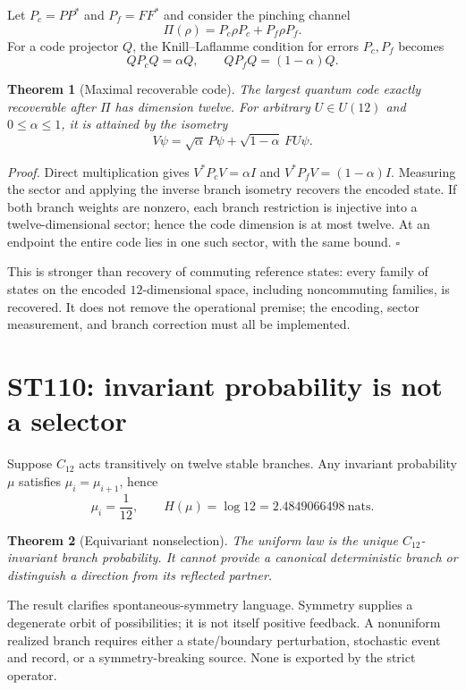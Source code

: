 \documentclass[11pt,a4paper]{article}
\newtheorem{theorem}{Theorem}[section]
\begin{document}
Let $P_c=PP^*$ and $P_f=FF^*$ and consider the pinching channel
\[
\Pi(\rho)=P_c\rho P_c+P_f\rho P_f.
\]
For a code projector $Q$, the Knill--Laflamme condition for errors $P_c,P_f$ becomes
\[
QP_cQ=\alpha Q,\qquad QP_fQ=(1-\alpha)Q.
\]

\begin{theorem}[Maximal recoverable code]
The largest quantum code exactly recoverable after $\Pi$ has dimension twelve. For arbitrary $U\in U(12)$ and $0\le\alpha\le1$, it is attained by the isometry
\[
V\psi=\sqrt\alpha\,P\psi+\sqrt{1-\alpha}\,FU\psi.
\]
\end{theorem}

\textit{Proof.} Direct multiplication gives $V^*P_cV=\alpha I$ and $V^*P_fV=(1-\alpha)I$. Measuring the sector and applying the inverse branch isometry recovers the encoded state. If both branch weights are nonzero, each branch restriction is injective into a twelve-dimensional sector; hence the code dimension is at most twelve. At an endpoint the entire code lies in one such sector, with the same bound. \hfill$\square$

This is stronger than recovery of commuting reference states: every family of states on the encoded $12$-dimensional space, including noncommuting families, is recovered. It does not remove the operational premise; the encoding, sector measurement, and branch correction must all be implemented.

\section{ST110: invariant probability is not a selector}

Suppose $C_{12}$ acts transitively on twelve stable branches. Any invariant probability $\mu$ satisfies $\mu_i=\mu_{i+1}$, hence
\[
\mu_i=\frac1{12},\qquad H(\mu)=\log12=2.4849066498\ \text{nats}.
\]

\begin{theorem}[Equivariant nonselection]
The uniform law is the unique $C_{12}$-invariant branch probability. It cannot provide a canonical deterministic branch or distinguish a direction from its reflected partner.
\end{theorem}

The result clarifies spontaneous-symmetry language. Symmetry supplies a degenerate orbit of possibilities; it is not itself positive feedback. A nonuniform realized branch requires either a state/boundary perturbation, stochastic event and record, or a symmetry-breaking source. None is exported by the strict operator.
\end{document}
